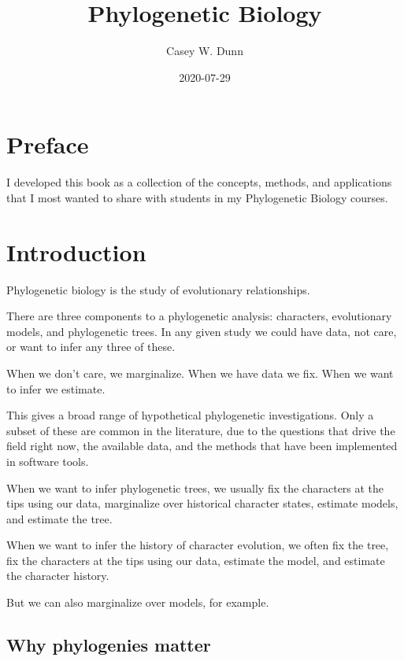\documentclass[
]{book}
\title{Phylogenetic Biology}
\author{Casey W. Dunn}
\date{2020-07-29}
\begin{document}
\maketitle

{
\setcounter{tocdepth}{1}
\tableofcontents
}
\hypertarget{preface}{%
\chapter*{Preface}\label{preface}}

I developed this book as a collection of the concepts, methods, and applications that I most wanted to share with students in my Phylogenetic Biology courses.

\hypertarget{intro}{%
\chapter{Introduction}\label{intro}}

Phylogenetic biology is the study of evolutionary relationships.

There are three components to a phylogenetic analysis: characters, evolutionary models, and phylogenetic trees. In any given study we could have data, not care, or want to infer any three of these.

When we don't care, we marginalize. When we have data we fix. When we want to infer we estimate.

This gives a broad range of hypothetical phylogenetic investigations. Only a subset of these are common in the literature, due to the questions that drive the field right now, the available data, and the methods that have been implemented in software tools.

When we want to infer phylogenetic trees, we usually fix the characters at the tips using our data, marginalize over historical character states, estimate models, and estimate the tree.

When we want to infer the history of character evolution, we often fix the tree, fix the characters at the tips using our data, estimate the model, and estimate the character history.

But we can also marginalize over models, for example.

\hypertarget{why-phylogenies-matter}{%
\section{Why phylogenies matter}\label{why-phylogenies-matter}}
\end{document}
